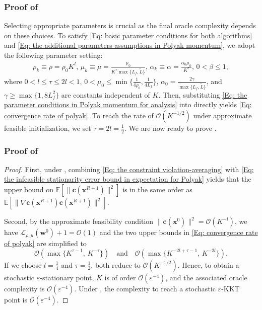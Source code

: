 \documentclass{article}
\theoremstyle{plain}
\theoremstyle{definition}
\theoremstyle{remark}
\newcommand{\EE}{\mathbb{E}}
\newcommand{\bx}{\bm{x}}
\newcommand{\bc}{\bm{c}}
\newcommand{\calL}{\mathcal{L}}
\newcommand{\calO}{\mathcal{O}}
\newcommand{\bw}{\bm{w}}
\numberwithin{equation}{section}
\begin{document}
\subsubsection{Proof of }
\label{subsubsec: proof Lemma Polyak}

Selecting appropriate parameters is crucial as the final oracle complexity depends on these choices. To satisfy \eqref{Eq: basic parameter conditions for both algorithms} and \eqref{Eq: the additional parameters assumptions in Polyak momentum}, we adopt the following parameter setting:
\begin{align}
\label{Eq: the parameter conditions in Polyak momentum for analysis}
\rho_{k}\equiv \rho = \rho_0 K^{l}, \,  \mu_{k}\equiv \mu = \frac{\mu_0}{K^{\tau}\max\{L_f, \tilde{L}\}}, \,  \alpha_{k}\equiv \alpha = \frac{\alpha_0 \mu_0}{K^{\tau}}, \, 0 < \beta \leq 1,
\end{align}
where $0<l\leq \tau \leq 2l<1$, $0 < \mu_0 \leq \min\{\frac{1}{4\rho_0}, \frac{1}{4L_f}\}$, $\alpha_0 = \frac{2\gamma}{\max\{L_f, \tilde{L}\}}$, and $\gamma \geq \max\{1, 8L_f^{2}\}$ are constants independent of $K$. Then, substituting \eqref{Eq: the parameter conditions in Polyak momentum for analysis} into  directly yields \eqref{Eq: convergence rate of polyak}. To reach the rate of $\calO(K^{-1/2})$ under approximate feasible initialization, we set $\tau = 2l = \tfrac{1}{2}$. We are now ready to prove .

\subsubsection{Proof of }
\label{proof: polyak with feasibility}
\begin{proof}
First, under , combining \eqref{Eq: the constraint violation-averaging} with \eqref{Eq: the infeasible stationarity error bound in expectation for Polyak} yields that the upper bound on $\EE[\|\bc(\bx^{R+1})\|^{2}]$ is in the same order as $\EE[\|\nabla\bc(\bx^{R+1})\bc(\bx^{R+1})\|^{2}]$.

Second, by the approximate feasibility condition $\|\bc(\bx^{0})\|^{2} = \calO(K^{-l})$, we have $\calL_{\rho,\mu}(\bw^{0}) + 1 = \calO(1)$ and the two upper bounds in \eqref{Eq: convergence rate of polyak} are simplified to
\[
\calO\!\left(\max\{K^{\tau-1},\,K^{-\tau}\}\right) \quad\text{and}\quad \calO\!\left(\max\{K^{-2l+\tau-1},\,K^{-2l}\}\right).
\]
If we choose $l = \tfrac{1}{4}$ and $\tau = \tfrac{1}{2}$, both reduce to $\calO(K^{-1/2})$. Hence, to obtain a stochastic $\varepsilon$-stationary point, $K$ is of order $\calO(\varepsilon^{-4})$, and the associated oracle complexity is $\calO(\varepsilon^{-4})$. Under , the complexity to reach a stochastic $\varepsilon$-KKT point is $\calO(\varepsilon^{-4})$.
\end{proof}
\end{document}
